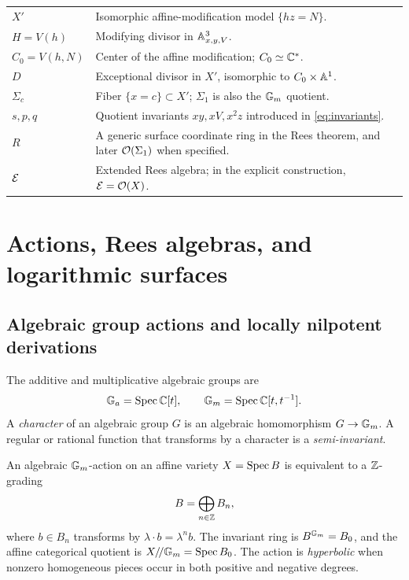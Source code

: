 \begin{longtable}{>{\raggedright\arraybackslash}p{}p{}}
$X'$ & Isomorphic affine-modification model $\{hz=N\}$. \\
$H=V(h)$ & Modifying divisor in $\mathbb A^3_{x,y,V}$. \\
$C_0=V(h,N)$ & Center of the affine modification; $C_0\simeq\mathbb C^*$. \\
$D$ & Exceptional divisor in $X'$, isomorphic to $C_0\times\mathbb A^1$. \\
$\Sigma_c$ & Fiber $\{x=c\}\subset X'$; $\Sigma_1$ is also the $\mathbb G_m$ quotient. \\
$s,p,q$ & Quotient invariants $xy,xV,x^2z$ introduced in \eqref{eq:invariants}. \\
$R$ & A generic surface coordinate ring in the Rees theorem, and later $\mathcal O(\Sigma_1)$ when specified. \\
$\mathcal E$ & Extended Rees algebra; in the explicit construction, $\mathcal E=\mathcal O(X)$. \\
\bottomrule
\end{longtable}


\section{Actions, Rees algebras, and logarithmic surfaces}\label{sec:actions-rees-log}

\subsection{Algebraic group actions and locally nilpotent derivations}

\begin{definition}\label{def:basic-groups}
The additive and multiplicative algebraic groups are
\[
  \mathbb G_a=\operatorname{Spec}\mathbb C[t],
  \qquad
  \mathbb G_m=\operatorname{Spec}\mathbb C[t,t^{-1}].
\]
A \emph{character} of an algebraic group $G$ is an algebraic homomorphism $G\to\mathbb G_m$.  A regular or rational function that transforms by a character is a \emph{semi-invariant}.
\end{definition}

\begin{definition}\label{def:gm-grading}
An algebraic $\mathbb G_m$-action on an affine variety $X=\operatorname{Spec} B$ is equivalent to a $\mathbb Z$-grading
\[
  B=\bigoplus_{n\in\mathbb Z}B_n,
\]
where $b\in B_n$ transforms by $\lambda\cdot b=\lambda^n b$.  The invariant ring is $B^{\mathbb G_m}=B_0$, and the affine categorical quotient is $X/\!/\mathbb G_m=\operatorname{Spec} B_0$.  The action is \emph{hyperbolic} when nonzero homogeneous pieces occur in both positive and negative degrees.
\end{definition}

